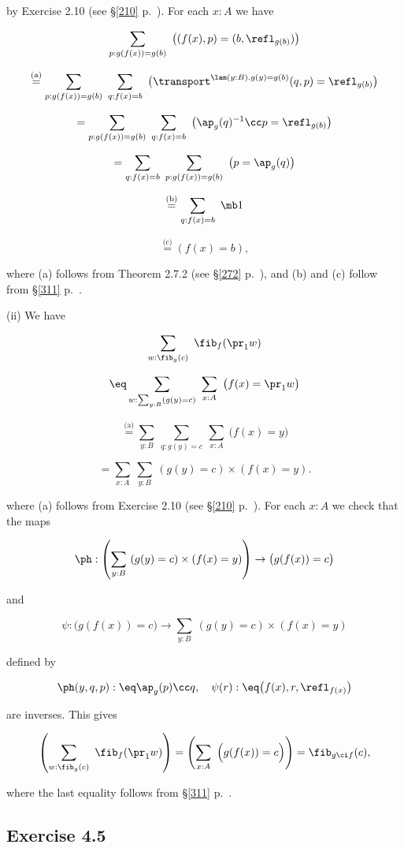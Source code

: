 \documentclass[12pt]{article}
\begin{document}
\nn by Exercise 2.10 (see \S\ref{210} p.~\pageref{210}). For each $x:A$ we have

$$\sum_{p:g(f(x))=g(b)}\ \big((f(x),p)=(b,\refl_{g(b)})\big)$$ 

$$\overset{\text{(a)}}=\sum_{p:g(f(x))=g(b)}\ \sum_{q:f(x)=b}\ \big(\transport^{\lam(y:B).g(y)=g(b)}(q,p)=\refl_{g(b)}\big)$$ 

$$=\sum_{p:g(f(x))=g(b)}\ \sum_{q:f(x)=b}\ \big(\ap_g(q)^{-1}\cc p=\refl_{g(b)}\big)$$ 

$$=\sum_{q:f(x)=b}\ \sum_{p:g(f(x))=g(b)}\ \big(p=\ap_g(q)\big)$$ 

$$\overset{\text{(b)}}=\sum_{q:f(x)=b}\ \mb1$$

$$\overset{\text{(c)}}=(f(x)=b),$$ 

\nn where (a) follows from Theorem 2.7.2 (see \S\ref{272} p.~\pageref{272}), and (b) and (c) follow from \S\ref{311} p.~\pageref{311}.

\nn(ii) We have 

$$\sum_{w:\fib_g(c)}\ \fib_f(\pr_1w)$$ 

$$\eq\sum_{w:\sum_{y:B}(g(y)=c)}\ \sum_{x:A}\ \big(f(x)=\pr_1w\big)$$ 

$$\overset{\text{(a)}}=\sum_{y:B}\ \sum_{q:g(y)=c}\ \sum_{x:A}\ \big(f(x)=y\big)$$ 

$$=\sum_{x:A}\ \sum_{y:B}\ (g(y)=c)\times(f(x)=y).$$ 

\nn where (a) follows from Exercise 2.10 (see \S\ref{210} p.~\pageref{210}). For each $x:A$ we check that the maps 

$$\ph:\left(\sum_{y:B}\ (g(y)=c)\times(f(x)=y)\right)\to\big(g(f(x))=c\big)$$ 

\nn and 

$$\psi:\big(g(f(x))=c\big)\to\sum_{y:B}\ (g(y)=c)\times(f(x)=y)$$ 

\nn defined by 

$$\ph(y,q,p):\eq\ap_g(p)\cc q,\quad\psi(r):\eq\big(f(x),r,\refl_{f(x)}\big)$$ 

\nn are inverses. This gives 

$$\left(\sum_{w:\fib_g(c)}\ \fib_f(\pr_1w)\right)=\left(\sum_{x:A}\ \Big(g(f(x))=c\Big)\right)=\fib_{g\ci f}(c),$$

\nn where the last equality follows from \S\ref{311} p.~\pageref{311}.


\subsection{Exercise 4.5}\label{45}
\end{document}
